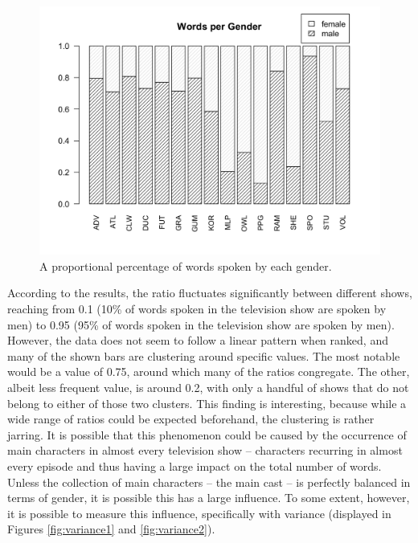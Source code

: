 \documentclass[a4paper, 11pt]{article}
\begin{document}
\begin{figure}[t!]
  \includegraphics[width=\linewidth]{figures/worpergen.png}
  \caption{A proportional percentage of words spoken by each gender.}
  \label{fig:worpergen}
\end{figure}

According to the results, the ratio fluctuates significantly between different shows, reaching from 0.1 (10\% of words spoken in the television show are spoken by men) to 0.95 (95\% of words spoken in the television show are spoken by men). However, the data does not seem to follow a linear pattern when ranked, and many of the shown bars are clustering around specific values. The most notable would be a value of 0.75, around which many of the ratios congregate. The other, albeit less frequent value, is around 0.2, with only a handful of shows that do not belong to either of those two clusters. This finding is interesting, because while a wide range of ratios could be expected beforehand, the clustering is rather jarring. It is possible that this phenomenon could be caused by the occurrence of main characters in almost every television show -- characters recurring in almost every episode and thus having a large impact on the total number of words. Unless the collection of main characters -- the main cast -- is perfectly balanced in terms of gender, it is possible this has a large influence. To some extent, however, it is possible to measure this influence, specifically with variance (displayed in Figures \ref{fig:variance1} and \ref{fig:variance2}).
\end{document}
